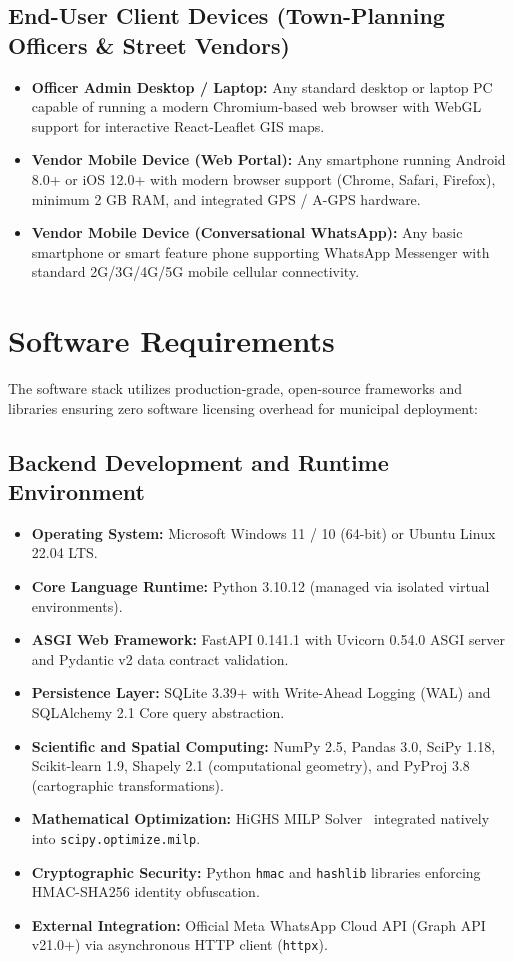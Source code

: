 \subsection{End-User Client Devices (Town-Planning Officers \& Street Vendors)}
\begin{itemize}
    \item \textbf{Officer Admin Desktop / Laptop:} Any standard desktop or laptop PC capable of running a modern Chromium-based web browser with WebGL support for interactive React-Leaflet GIS maps.
    \item \textbf{Vendor Mobile Device (Web Portal):} Any smartphone running Android 8.0+ or iOS 12.0+ with modern browser support (Chrome, Safari, Firefox), minimum 2 GB RAM, and integrated GPS / A-GPS hardware.
    \item \textbf{Vendor Mobile Device (Conversational WhatsApp):} Any basic smartphone or smart feature phone supporting WhatsApp Messenger with standard 2G/3G/4G/5G mobile cellular connectivity.
\end{itemize}

\section{Software Requirements}
\label{sec:software_requirements}

The software stack utilizes production-grade, open-source frameworks and libraries ensuring zero software licensing overhead for municipal deployment:

\subsection{Backend Development and Runtime Environment}
\begin{itemize}
    \item \textbf{Operating System:} Microsoft Windows 11 / 10 (64-bit) or Ubuntu Linux 22.04 LTS.
    \item \textbf{Core Language Runtime:} Python 3.10.12 (managed via isolated virtual environments).
    \item \textbf{ASGI Web Framework:} FastAPI 0.141.1 with Uvicorn 0.54.0 ASGI server and Pydantic v2 data contract validation.
    \item \textbf{Persistence Layer:} SQLite 3.39+ with Write-Ahead Logging (WAL) and SQLAlchemy 2.1 Core query abstraction.
    \item \textbf{Scientific and Spatial Computing:} NumPy 2.5, Pandas 3.0, SciPy 1.18, Scikit-learn 1.9, Shapely 2.1 (computational geometry), and PyProj 3.8 (cartographic transformations).
    \item \textbf{Mathematical Optimization:} HiGHS MILP Solver~\cite{huang2023highs} integrated natively into \texttt{scipy.optimize.milp}.
    \item \textbf{Cryptographic Security:} Python \texttt{hmac} and \texttt{hashlib} libraries enforcing HMAC-SHA256 identity obfuscation.
    \item \textbf{External Integration:} Official Meta WhatsApp Cloud API (Graph API v21.0+) via asynchronous HTTP client (\texttt{httpx}).
\end{itemize}

